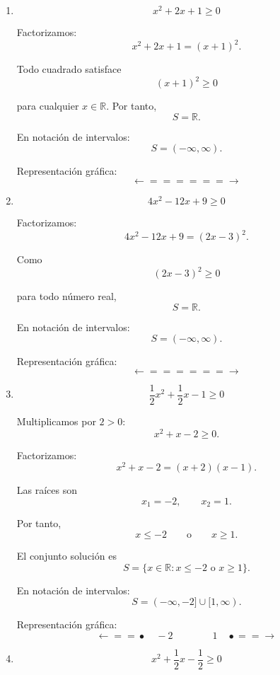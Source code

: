\documentclass[12pt]{article}
\begin{document}
{\begin{enumerate}
En notación de intervalos:
\[
\boxed{
S=(-\infty,1]\cup[3,\infty).
}
\]

Representación gráfica:
\[
\longleftarrow\!\!=\!\!=\!\bullet
\quad1
\qquad\qquad
3\quad
\bullet\!\!=\!\!=\!\longrightarrow
\]

\item
\[
x^2+2x+1\geq0
\]

Factorizamos:
\[
x^2+2x+1=(x+1)^2.
\]

Todo cuadrado satisface
\[
(x+1)^2\geq0
\]

para cualquier \(x\in\mathbb{R}\). Por tanto,
\[
\boxed{
S=\mathbb{R}.
}
\]

En notación de intervalos:
\[
\boxed{
S=(-\infty,\infty).
}
\]

Representación gráfica:
\[
\longleftarrow\!\!=\!\!=\!\!=\!\!=\!\!=\!\!=\!\longrightarrow
\]

\item
\[
4x^2-12x+9\geq0
\]

Factorizamos:
\[
4x^2-12x+9=(2x-3)^2.
\]

Como
\[
(2x-3)^2\geq0
\]

para todo número real,
\[
\boxed{
S=\mathbb{R}.
}
\]

En notación de intervalos:
\[
\boxed{
S=(-\infty,\infty).
}
\]

Representación gráfica:
\[
\longleftarrow\!\!=\!\!=\!\!=\!\!=\!\!=\!\!=\!\longrightarrow
\]

\item
\[
\frac{1}{2}x^2+\frac{1}{2}x-1\geq0
\]

Multiplicamos por \(2>0\):
\[
x^2+x-2\geq0.
\]

Factorizamos:
\[
x^2+x-2=(x+2)(x-1).
\]

Las raíces son
\[
x_1=-2,
\qquad
x_2=1.
\]

Por tanto,
\[
x\leq-2
\qquad\text{o}\qquad
x\geq1.
\]

El conjunto solución es
\[
\boxed{
S=
\{x\in\mathbb{R}:x\leq-2\text{ o }x\geq1\}.
}
\]

En notación de intervalos:
\[
\boxed{
S=(-\infty,-2]\cup[1,\infty).
}
\]

Representación gráfica:
\[
\longleftarrow\!\!=\!\!=\!\bullet
\quad-2
\qquad\qquad
1\quad
\bullet\!\!=\!\!=\!\longrightarrow
\]

\item
\[
x^2+\frac{1}{2}x-\frac{1}{2}\geq0
\]


\end{enumerate}}
\end{document}
